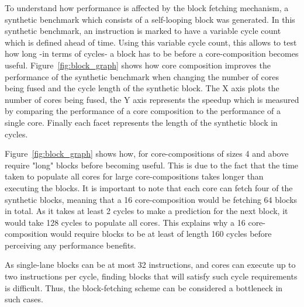 To understand how performance is affected by the block fetching mechanism, a synthetic benchmark which consists of a self-looping block was generated.
In this synthetic benchmark, an instruction is marked to have a variable cycle count which is defined ahead of time.
Using this variable cycle count, this allows to test how long -in terms of cycles- a block has to be before a core-composition becomes useful.
Figure~\ref{fig:block_graph} shows how core composition improves the performance of the synthetic benchmark when changing the number of cores being fused and the cycle length of the synthetic block.
The X axis plots the number of cores being fused, the Y axis represents the speedup which is measured by comparing the performance of a core composition to the performance of a single core.
Finally each facet represents the length of the synthetic block in cycles.

Figure~\ref{fig:block_graph} shows how, for core-compositions of sizes 4 and above require "long" blocks before becoming useful.
This is due to the fact that the time taken to populate all cores for large core-compositions takes longer than executing the blocks.
It is important to note that each core can fetch four of the synthetic blocks, meaning that a 16 core-composition would be fetching 64 blocks in total.
As it takes at least 2 cycles to make a prediction for the next block, it would take 128 cycles to populate all cores.
This explains why a 16 core-composition would require blocks to be at least of length 160 cycles before perceiving any performance benefits.

As single-lane blocks can be at most 32 instructions, and cores can execute up to two instructions per cycle, finding blocks that will satisfy such cycle requirements is difficult.
Thus, the block-fetching scheme can be considered a bottleneck in such cases.